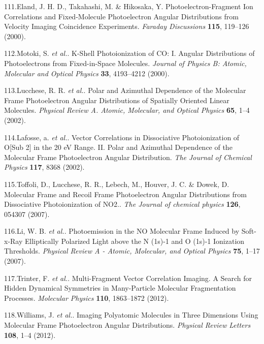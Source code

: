 \documentclass[10pt]{article}
\begin{document}
\label{csl:111}111.Eland, J. H. D., Takahashi, M. \& Hikosaka, Y. {Photoelectron-Fragment Ion Correlations and Fixed-Molecule Photoelectron Angular Distributions from Velocity Imaging Coincidence Experiments}. \textit{Faraday Discussions} \textbf{115}, 119–126 (2000).

\label{csl:112}112.Motoki, S. \textit{et al.}. {K-Shell Photoionization of {{CO}}: {{I}}. {{Angular}} Distributions of Photoelectrons from Fixed-in-Space Molecules}. \textit{Journal of Physics B: Atomic, Molecular and Optical Physics} \textbf{33}, 4193–4212 (2000).

\label{csl:113}113.Lucchese, R. R. \textit{et al.}. {Polar and Azimuthal Dependence of the Molecular Frame Photoelectron Angular Distributions of Spatially Oriented Linear Molecules}. \textit{Physical Review A. Atomic, Molecular, and Optical Physics} \textbf{65}, 1–4 (2002).

\label{csl:114}114.Lafosse, a. \textit{et al.}. {Vector Correlations in Dissociative Photoionization of {{O}}[Sub 2] in the 20 {{eV}} Range. {{II}}. {{Polar}} and Azimuthal Dependence of the Molecular Frame Photoelectron Angular Distribution}. \textit{The Journal of Chemical Physics} \textbf{117}, 8368 (2002).

\label{csl:115}115.Toffoli, D., Lucchese, R. R., Lebech, M., Houver, J. C. \& Dowek, D. {Molecular Frame and Recoil Frame Photoelectron Angular Distributions from Dissociative Photoionization of {{NO2}}.}. \textit{The Journal of chemical physics} \textbf{126}, 054307 (2007).

\label{csl:116}116.Li, W. B. \textit{et al.}. {Photoemission in the {{NO}} Molecular Frame Induced by Soft-x-Ray Elliptically Polarized Light above the {{N}} (1s)-1 and {{O}} (1s)-1 Ionization Thresholds}. \textit{Physical Review A - Atomic, Molecular, and Optical Physics} \textbf{75}, 1–17 (2007).

\label{csl:117}117.Trinter, F. \textit{et al.}. {Multi-Fragment Vector Correlation Imaging. {{A}} Search for Hidden Dynamical Symmetries in Many-Particle Molecular Fragmentation Processes}. \textit{Molecular Physics} \textbf{110}, 1863–1872 (2012).

\label{csl:118}118.Williams, J. \textit{et al.}. {Imaging {{Polyatomic Molecules}} in {{Three Dimensions Using Molecular Frame Photoelectron Angular Distributions}}}. \textit{Physical Review Letters} \textbf{108}, 1–4 (2012).
\end{document}
